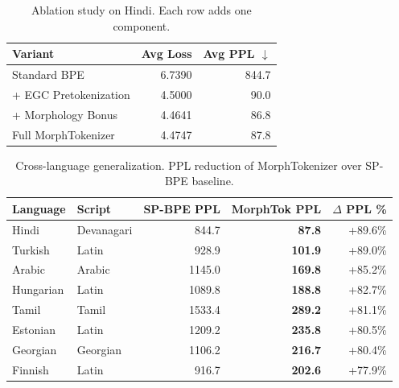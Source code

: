 \begin{table}[t]
\centering
\caption{Ablation study on Hindi. Each row adds one component.}
\label{tab:ablation}
\begin{tabular}{l r r}
\toprule
\textbf{Variant} & \textbf{Avg Loss} & \textbf{Avg PPL $\downarrow$} \\
\midrule
Standard BPE & 6.7390 & 844.7 \\
+ EGC Pretokenization & 4.5000 & 90.0 \\
+ Morphology Bonus & 4.4641 & 86.8 \\
Full MorphTokenizer & 4.4747 & 87.8 \\
\bottomrule
\end{tabular}
\end{table}

\begin{table}[t]
\centering
\caption{Cross-language generalization. PPL reduction of MorphTokenizer over SP-BPE baseline.}
\label{tab:crosslang}
\begin{tabular}{l l r r r}
\toprule
\textbf{Language} & \textbf{Script} & \textbf{SP-BPE PPL} & \textbf{MorphTok PPL} & \textbf{$\Delta$ PPL \%} \\
\midrule
Hindi & Devanagari & 844.7 & \textbf{87.8} & +89.6\% \\
Turkish & Latin & 928.9 & \textbf{101.9} & +89.0\% \\
Arabic & Arabic & 1145.0 & \textbf{169.8} & +85.2\% \\
Hungarian & Latin & 1089.8 & \textbf{188.8} & +82.7\% \\
Tamil & Tamil & 1533.4 & \textbf{289.2} & +81.1\% \\
Estonian & Latin & 1209.2 & \textbf{235.8} & +80.5\% \\
Georgian & Georgian & 1106.2 & \textbf{216.7} & +80.4\% \\
Finnish & Latin & 916.7 & \textbf{202.6} & +77.9\% \\
\bottomrule
\end{tabular}
\end{table}